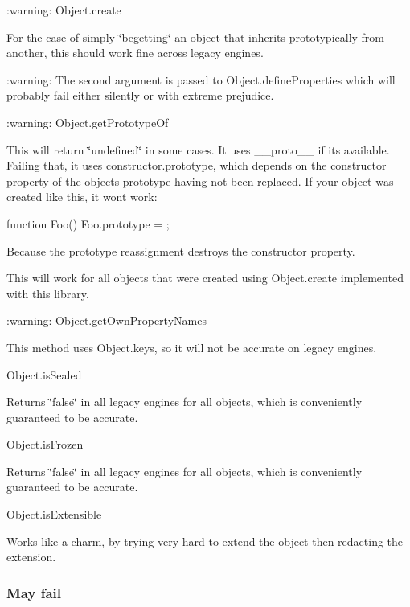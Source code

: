 \begin{DoxyItemize}
\item \+:warning\+: Object.\+create

For the case of simply \char`\"{}begetting\char`\"{} an object that inherits prototypically from another, this should work fine across legacy engines.

\+:warning\+: The second argument is passed to Object.\+define\+Properties which will probably fail either silently or with extreme prejudice.
\item \+:warning\+: Object.\+get\+Prototype\+Of

This will return \char`\"{}undefined\char`\"{} in some cases. It uses {\ttfamily \+\_\+\+\_\+proto\+\_\+\+\_\+} if it\textquotesingle{}s available. Failing that, it uses constructor.\+prototype, which depends on the constructor property of the object\textquotesingle{}s prototype having not been replaced. If your object was created like this, it won\textquotesingle{}t work\+: \begin{DoxyVerb}function Foo() {
}
Foo.prototype = {};
\end{DoxyVerb}


Because the prototype reassignment destroys the constructor property.

This will work for all objects that were created using {\ttfamily Object.\+create} implemented with this library.
\item \+:warning\+: Object.\+get\+Own\+Property\+Names

This method uses Object.\+keys, so it will not be accurate on legacy engines.
\item Object.\+is\+Sealed

Returns \char`\"{}false\char`\"{} in all legacy engines for all objects, which is conveniently guaranteed to be accurate.
\item Object.\+is\+Frozen

Returns \char`\"{}false\char`\"{} in all legacy engines for all objects, which is conveniently guaranteed to be accurate.
\item Object.\+is\+Extensible

Works like a charm, by trying very hard to extend the object then redacting the extension.
\end{DoxyItemize}

\subsubsection*{May fail}


